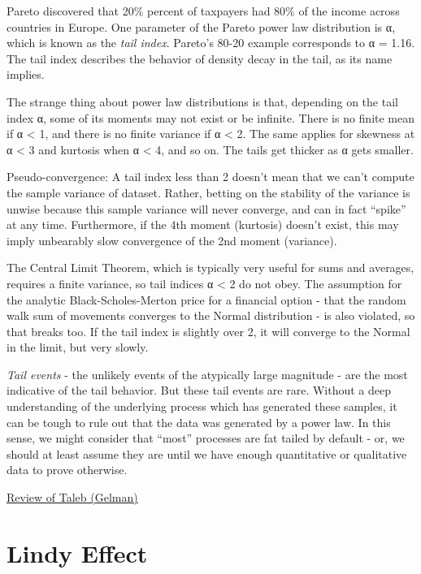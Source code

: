 \documentclass[
]{book}
\begin{document}
Pareto discovered that 20\% percent of taxpayers had 80\% of the income across countries in Europe.
One parameter of the Pareto power law distribution is α, which is known as the \emph{tail index}.
Pareto's 80-20 example corresponds to α = 1.16.
The tail index describes the behavior of density decay in the tail, as its name implies.

The strange thing about power law distributions is that, depending on the tail index α,
some of its moments may not exist or be infinite.
There is no finite mean if α \textless{} 1,
and there is no finite variance if α \textless{} 2.
The same applies for skewness at α \textless{} 3 and kurtosis when α \textless{} 4, and so on.
The tails get thicker as α gets smaller.

Pseudo-convergence: A tail index less than 2 doesn't mean that we can't compute the sample variance of dataset. Rather, betting on the stability of the variance is unwise because this sample variance will never converge, and can in fact ``spike'' at any time. Furthermore, if the 4th moment (kurtosis) doesn't exist, this may imply unbearably slow convergence of the 2nd moment (variance).

The Central Limit Theorem, which is typically very useful for sums and averages, requires a finite variance, so tail indices α \textless{} 2 do not obey. The assumption for the analytic Black-Scholes-Merton price for a financial option - that the random walk sum of movements converges to the Normal distribution - is also violated, so that breaks too. If the tail index is slightly over 2, it will converge to the Normal in the limit, but very slowly.

\emph{Tail events} - the unlikely events of the atypically large magnitude - are the most indicative of the tail behavior. But these tail events are rare. Without a deep understanding of the underlying process which has generated these samples, it can be tough to rule out that the data was generated by a power law. In this sense, we might consider that ``most'' processes are fat tailed by default - or, we should at least assume they are until we have enough quantitative or qualitative data to prove otherwise.

\href{https://gelman.me/scoft.html}{Review of Taleb (Gelman)}

\hypertarget{lindy-effect}{%
\section{Lindy Effect}\label{lindy-effect}}
\end{document}
